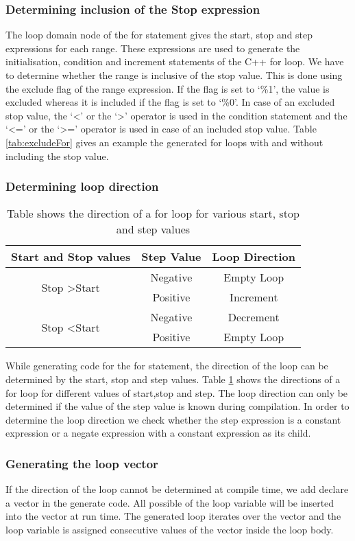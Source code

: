 \subsubsection{Determining inclusion of the Stop expression}
The loop domain node of the for statement gives the start, stop and step expressions for each range. These expressions are used to generate the initialisation, condition and increment statements of the C++ for loop. We have to determine whether the range is  inclusive of the stop value.  This is done using the exclude flag of the range expression. If the flag is set to `\%1', the value is excluded whereas it is included if the flag is set to `\%0'. In case of an excluded stop value, the `<' or the `>' operator is used in the condition statement and the `<=' or the `>=' operator is used in case of an included stop value. Table \ref{tab:excludeFor} gives an example the generated for loops with and without including the stop value.
\subsubsection{Determining loop direction}
\begin{table}[htbp]
\centering
\begin{tabular}{|c|c|c|}
\hline
Start and Stop values & Step Value & Loop Direction \\ \hline
\multirow{2}{*}{Stop  \textgreater  Start} & Negative & Empty Loop \\ \cline{2-3} 
 & Positive & Increment \\ \hline
\multirow{2}{*}{Stop \textless Start} & Negative & Decrement \\ \cline{2-3} 
 & Positive & Empty Loop \\ \hline
\end{tabular}
\caption[Loop Direction]{Table shows the direction of a for loop for various start, stop and step values}
\label{tab:loopDirection}
\end{table}
While generating code for the for statement, the direction of the loop can be determined by the start, stop and step values. Table \ref{tab:loopDirection} shows the directions of a for loop for different values of start,stop and step. The loop direction can only be determined if the value of the step value is known during compilation. In order to determine the loop direction we check whether the step expression is  a constant expression or a negate expression with a constant expression as its child.
\subsubsection{ Generating the loop vector}
If the direction of the loop cannot be determined at compile time, we add declare a vector in the generate code. All possible of the loop variable will be inserted into the vector at run time. The generated loop iterates over the vector and the loop variable is assigned consecutive values of the vector inside the loop body. 
